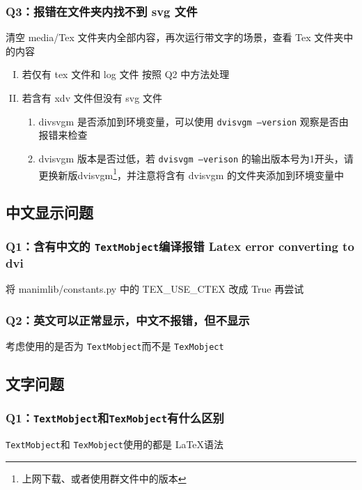 \documentclass[a4paper]{article}
\newcommand{\TexMobject}{\texttt{TexMobject}}
\newcommand{\TextMobject}{\texttt{TextMobject}}
\begin{document}
\subsubsection*{Q3：报错在文件夹内找不到 svg 文件}
清空 media/Tex 文件夹内全部内容，再次运行带文字的场景，查看 Tex 文件夹中的内容

\begin{enumerate}[I.]
    \item 若仅有 tex 文件和 log 文件
    按照 Q2 中方法处理

    \item 若含有 xdv 文件但没有 svg 文件
    \begin{enumerate}[1.]
        \item divsvgm 是否添加到环境变量，可以使用 \texttt{dvisvgm --version} 观察是否由报错来检查
        \item dvisvgm 版本是否过低，若 \texttt{dvisvgm --verison} 的输出版本号为1开头，请更换新版dvisvgm\footnote{上网下载、或者使用群文件中的版本}，并注意将含有 dvisvgm 的文件夹添加到环境变量中
    \end{enumerate}
\end{enumerate}

\subsection{中文显示问题}
\subsubsection*{Q1：含有中文的 \TextMobject 编译报错 Latex error converting to dvi}

将 manimlib/constants.py 中的 TEX\_USE\_CTEX 改成 True 再尝试

\subsubsection*{Q2：英文可以正常显示，中文不报错，但不显示}

考虑使用的是否为 \TextMobject 而不是 \TexMobject


\subsection{文字问题}
\subsubsection*{Q1：\TextMobject 和\TexMobject 有什么区别}

\TextMobject 和 \TexMobject 使用的都是 \LaTeX 语法
\end{document}
